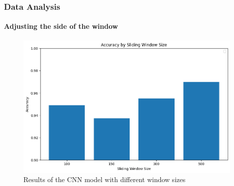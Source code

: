 \documentclass[
	11pt, %
]{beamer}
\begin{document}
\begin{frame}

    \frametitle{Data Analysis}
    \framesubtitle{Adjusting the side of the window}

    \begin{figure}
        \includegraphics[width=0.6\linewidth]{window_size.png}
        \caption{Results of the CNN model with different window sizes}
    \end{figure}
    
\end{frame}
\end{document}
